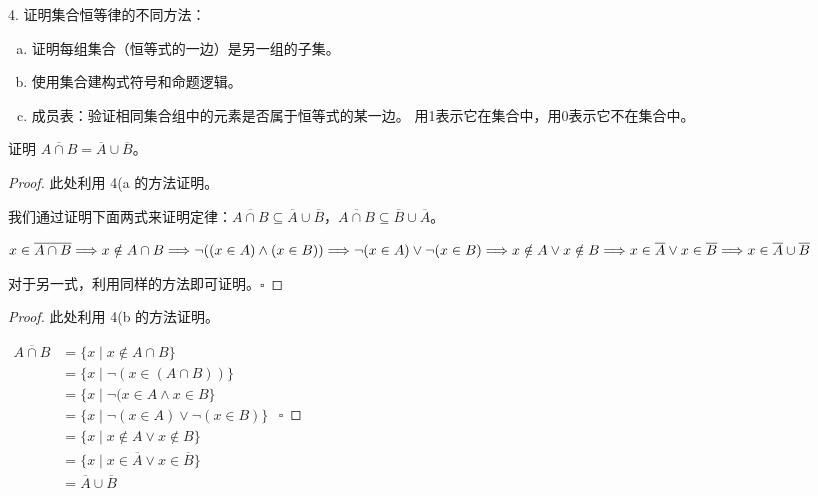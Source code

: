 \documentclass[normal,cyan]{elegantnote}
\newcommand{\QED}{\square}
\begin{document}
4. 证明集合恒等律的不同方法：
\begin{enumerate}[a)]
    \item 证明每组集合（恒等式的一边）是另一组的子集。
    \item 使用集合建构式符号和命题逻辑。
    \item 成员表：验证相同集合组中的元素是否属于恒等式的某一边。 用1表示它在集合中，用0表示它不在集合中。
\end{enumerate}
\begin{example}
    证明 $\overline{A \cap B} = \overline{A} \cup \overline{B}$。
\end{example}
\begin{proof}
    此处利用 4(a 的方法证明。
    
    我们通过证明下面两式来证明定律：$\overline{A \cap B} \subseteq \overline{A} \cup \overline{B}$，$\overline{A \cap B} \subseteq \overline{B} \cup \overline{A}$。
    
    $x \in \overline{A \cap B} \\
        \Longrightarrow x \notin A \cap B \\
        \Longrightarrow \neg ((x \in A) \wedge (x \in B)) \\
        \Longrightarrow \neg(x \in A) \vee \neg(x \in B) \\
        \Longrightarrow x \notin A \vee x \notin B \\
        \Longrightarrow x \in \overline{A} \vee x \in \overline{B} \\
        \Longrightarrow x \in \overline{A} \cup \overline{B}$

    对于另一式，利用同样的方法即可证明。$\QED$
\end{proof}
\begin{proof}
    此处利用 4(b 的方法证明。

    $\begin{aligned}\overline{A \cap B} &= \{x \mid x \notin A \cap B\} \\
    &= \{x \mid \neg(x \in(A \cap B))\} \\
    &= \{x \mid \neg(x \in A \wedge x \in B\} \\
    &= \{x \mid \neg(x \in A) \vee \neg(x \in B)\} \\
    &= \{x \mid x \notin A \vee x \notin B\} \\
    &= \{x \mid x \in \overline{A} \vee x \in \overline{B}\} \\
    &= \overline{A} \cup \overline{B}\end{aligned}$ $\QED$
\end{proof}
\end{document}
